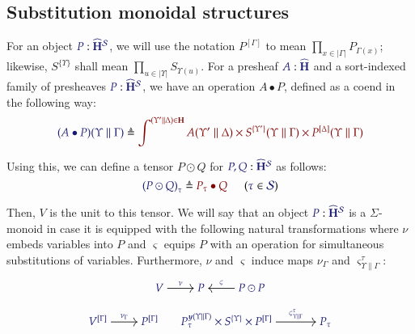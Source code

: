 \documentclass[11pt]{article}
\theoremstyle{definition}
\theoremstyle{remark}
\numberwithin{equation}{section}
\def\IModeColorName{MidnightBlue}
\def\OModeColorName{Maroon}
\newcommand\IMode[1]{{\color{\IModeColorName}{#1}}}
\newcommand\OMode[1]{{\color{\OModeColorName}{#1}}}
\newcommand\HypJ[2]{#1\ \ (#2)}
\newcommand\Member[2]{\IMode{#1}\in\IMode{#2}}
\newcommand\Of[2]{\IMode{#1}: \IMode{#2}}
\newcommand\Sorts{\mathcal{S}}
\newcommand\HypCat{\mathbf{H}}
\newcommand\Dom[1]{\left\vert#1\right\vert}
\newcommand\Define[2]{\IMode{#1}\triangleq\OMode{#2}}
\newcommand\Yoneda[1]{\boldsymbol{y} (#1)}
\begin{document}
\subsection{Substitution monoidal structures}

For an object $\Of{P}{\widehat{\HypCat}^\Sorts}$, we will use the notation
$P^{[\Gamma]}$ to mean $\prod_{x\in\Dom\Gamma}P_{\Gamma(x)}$; likewise,
$S^{\{\Upsilon\}}$ shall mean $\prod_{u\in\Dom\Upsilon}S_{\Upsilon(u)}$. For a
presheaf $\Of{A}{\widehat{\HypCat}}$ and a sort-indexed family of presheaves
$\Of{P}{\widehat{\HypCat}^\Sorts}$, we have an operation $A\bullet P$, defined
as a coend in the following way:
\[
  \Define{(A\bullet P)(\Upsilon\parallel\Gamma)}{
    \int^{(\Upsilon'\parallel\Delta)\in\HypCat}
      A(\Upsilon'\parallel\Delta)
      \times S^{\{\Upsilon'\}}(\Upsilon\parallel\Gamma)
      \times P^{[\Delta]}(\Upsilon\parallel\Gamma)
  }
\]

Using this, we can define a tensor $P\odot Q$ for
$\Of{P,Q}{\widehat{\HypCat}^\Sorts}$ as follows:
\[
  \HypJ{
    \Define{{(P\odot Q)}_{\tau}}{
      P_\tau\bullet Q
    }
\quad
  }{
    \Member{\tau}{\Sorts}
  }
\]

Then, $V$ is the unit to this tensor. We will say that an object
$\Of{P}{\widehat{\HypCat}^\Sorts}$ is a $\Sigma$-monoid in case it is equipped
with the following natural transformations where $\nu$ embeds variables into $P$
and $\varsigma$ equips $P$ with an operation for simultaneous substitutions of
variables. Furthermore, $\nu$ and $\varsigma$ induce maps ${\nu}_{\Gamma}$ and
${\varsigma}^{\tau}_{\Upsilon\parallel\Gamma}$:
\begin{gather*}
  \begin{tikzcd}[cramped, ampersand replacement = \&]
    {\IMode{V}} \arrow[r, "\IMode\nu"]
    \&
    {\IMode{P}}
    \&
    {\IMode{P\odot P}}
      \arrow[l, swap, "\IMode\varsigma"]
  \end{tikzcd}\\[6pt]
  \begin{tikzcd}[cramped, ampersand replacement = \&]
    {\IMode{{V}^{[\Gamma]}}}
      \arrow[r, "\IMode{{\nu}_{\Gamma}}"]
    \&
    {\IMode{{P}^{[\Gamma]}}}
  \end{tikzcd}
  \qquad
  \begin{tikzcd}[cramped, sep = large, ampersand replacement = \&]
    {\IMode{{P_\tau^{\Yoneda{\Upsilon\parallel\Gamma}}\times S^{\{\Upsilon\}}\times P^{[\Gamma]}}}}
      \arrow[r, "\IMode{\varsigma^\tau_{\Upsilon\parallel\Gamma}}"]
    \&
    {\IMode{P_\tau}}
  \end{tikzcd}
\end{gather*}
\end{document}
